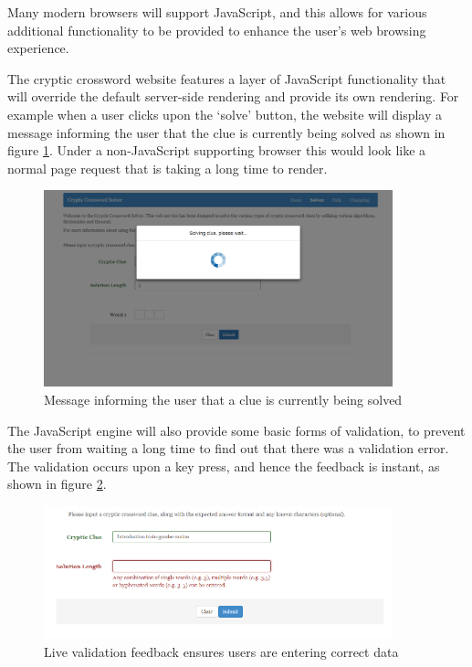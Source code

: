 Many modern browsers will support JavaScript, and this allows for various 
additional functionality to be provided to enhance the user's web browsing 
experience.

The cryptic crossword website features a layer of JavaScript functionality that 
will override the default server-side rendering and provide its own rendering. 
For example when a user clicks upon the `solve' button, the website will display
a message informing the user that the clue is currently being solved as shown in
figure \ref{fig:solving_clue_message}. Under a non-JavaScript supporting browser
this would look like a normal page request that is taking a long time to render.

\begin{figure}[H]
  \centering
  \includegraphics[width=0.9\textwidth]{images/solving_clue.png}
  \caption{Message informing the user that a clue is currently being solved}
  \label{fig:solving_clue_message}
\end{figure}

The JavaScript engine will also provide some basic forms of validation, to 
prevent the user from waiting a long time to find out that there was a 
validation error. The validation occurs upon a key press, and hence the feedback
is instant, as shown in figure \ref{fig:validation_message}.

\begin{figure}[H]
  \centering
  \includegraphics[width=0.9\textwidth]{images/validation.png}
  \caption{Live validation feedback ensures users are entering correct data}
  \label{fig:validation_message}
\end{figure}

